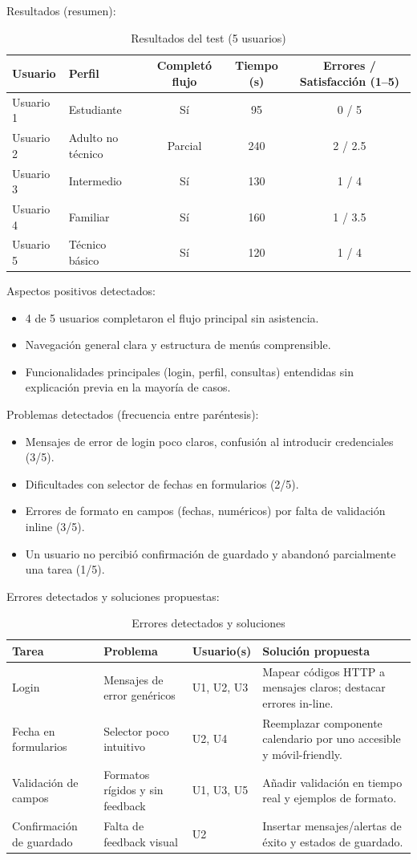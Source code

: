 \documentclass[a4paper,11pt]{article}
\begin{document}
Resultados (resumen):
\begin{table}[ht]
\centering
\caption{Resultados del test (5 usuarios)}
\begin{tabularx}{0.9\textwidth}{l l c c c}
\toprule
Usuario & Perfil & Completó flujo & Tiempo (s) & Errores / Satisfacción (1--5) \\
\midrule
Usuario 1 & Estudiante & Sí & 95 & 0 / 5 \\
Usuario 2 & Adulto no técnico & Parcial & 240 & 2 / 2.5 \\
Usuario 3 & Intermedio & Sí & 130 & 1 / 4 \\
Usuario 4 & Familiar & Sí & 160 & 1 / 3.5 \\
Usuario 5 & Técnico básico & Sí & 120 & 1 / 4 \\
\bottomrule
\end{tabularx}
\end{table}

Aspectos positivos detectados:
\begin{itemize}
	\item 4 de 5 usuarios completaron el flujo principal sin asistencia.
	\item Navegación general clara y estructura de menús comprensible.
	\item Funcionalidades principales (login, perfil, consultas) entendidas sin explicación previa en la mayoría de casos.
\end{itemize}

Problemas detectados (frecuencia entre paréntesis):
\begin{itemize}
	\item Mensajes de error de login poco claros, confusión al introducir credenciales (3/5).
	\item Dificultades con selector de fechas en formularios (2/5).
	\item Errores de formato en campos (fechas, numéricos) por falta de validación inline (3/5).
	\item Un usuario no percibió confirmación de guardado y abandonó parcialmente una tarea (1/5).
\end{itemize}

Errores detectados y soluciones propuestas:
\begin{table}[ht]
\centering
\caption{Errores detectados y soluciones}
\begin{tabularx}{\textwidth}{l l l X}
\toprule
Tarea & Problema & Usuario(s) & Solución propuesta \\
\midrule
Login & Mensajes de error genéricos & U1, U2, U3 & Mapear códigos HTTP a mensajes claros; destacar errores in-line. \\
Fecha en formularios & Selector poco intuitivo & U2, U4 & Reemplazar componente calendario por uno accesible y móvil-friendly. \\
Validación de campos & Formatos rígidos y sin feedback & U1, U3, U5 & Añadir validación en tiempo real y ejemplos de formato. \\
Confirmación de guardado & Falta de feedback visual & U2 & Insertar mensajes/alertas de éxito y estados de guardado. \\
\bottomrule
\end{tabularx}
\end{table}
\end{document}
